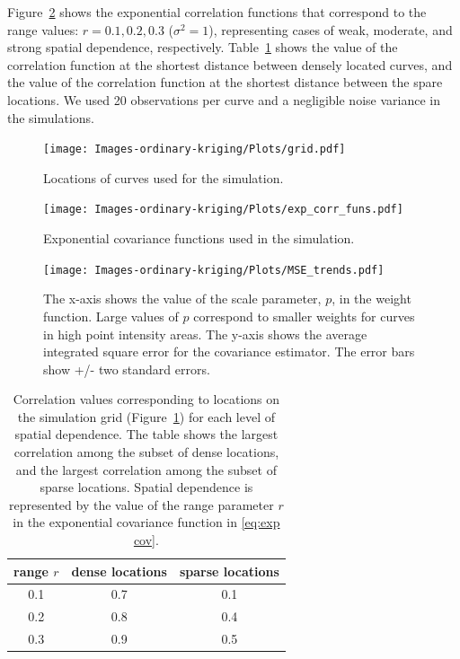 Figure~\ref{fig:exp_corr_funs} shows the exponential correlation functions that correspond to the range values: $r = 0.1, 0.2, 0.3$ ($\sigma^2=1$), representing cases of weak, moderate, and strong spatial dependence, respectively. Table~\ref{tab:corr values} shows the value of the correlation function at the shortest distance between densely located curves, and the value of the correlation function at the shortest distance between the spare locations. We used 20 observations per curve and a negligible noise variance in the simulations. 

\begin{figure}
	\begin{center}
		\texttt{[image: Images-ordinary-kriging/Plots/grid.pdf]} 
	\end{center}
	\caption{Locations of curves used for the simulation.} \label{fig:grid3} 
\end{figure}

\begin{figure}
	\begin{center}
		\texttt{[image: Images-ordinary-kriging/Plots/exp\_corr\_funs.pdf]} 
	\end{center}
	\caption{Exponential covariance functions used in the simulation.} \label{fig:exp_corr_funs} 
\end{figure}

\begin{figure}
	\begin{center}
		\texttt{[image: Images-ordinary-kriging/Plots/MSE\_trends.pdf]} 
	\end{center}
	\caption{The x-axis shows the value of the scale parameter, $p$, in the weight function. Large values of $p$ correspond to smaller weights for curves in high point intensity areas. The y-axis shows the average integrated square error for the covariance estimator. The error bars show +/- two standard errors.} \label{fig:MSE_trends} 
\end{figure}


\begin{table}
	\begin{center}
	\caption{Correlation values corresponding to locations on the simulation grid (Figure~\ref{fig:grid3}) for each level of spatial dependence. The table shows the largest correlation among the subset of dense locations, and the largest correlation among the subset of sparse locations. Spatial dependence is represented by the value of the range parameter $r$ in the exponential covariance function in \eqref{eq:exp cov}.}
\begin{tabular}{|c|c|c|}
	\hline
	range $r$ & dense locations & sparse locations \\
	\hline
	0.1 & 0.7 & 0.1 \\
	0.2 & 0.8 & 0.4 \\
	0.3 & 0.9 & 0.5 \\
	\hline
\end{tabular}
\label{tab:corr values}
\end{center}
\end{table}

